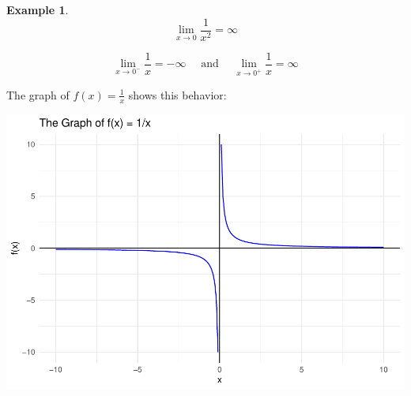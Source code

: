 \documentclass[
]{book}
\theoremstyle{definition}
\theoremstyle{definition}
\newtheorem{example}{Example}[chapter]
\theoremstyle{definition}
\theoremstyle{definition}
\theoremstyle{remark}
\begin{document}
\begin{example}
\protect\hypertarget{exm:unnamed-chunk-32}{}\label{exm:unnamed-chunk-32}\[
\lim _{x \rightarrow 0} \frac{1}{x^{2}}=\infty
\]

\[
\lim _{x \rightarrow 0^{-}} \frac{1}{x}=-\infty \quad \text { and } \quad \lim _{x \rightarrow 0^{+}} \frac{1}{x}=\infty
\]
\end{example}

The graph of \(f(x)=\frac{1}{x}\) shows this behavior:

\includegraphics{_main_files/figure-latex/unnamed-chunk-33-1.pdf}
\end{document}
